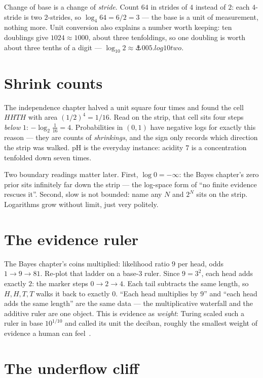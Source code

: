 \begin{narrative}
Change of base is a change of \emph{stride}. Count $64$ in strides of
$4$ instead of $2$: each $4$-stride is two $2$-strides, so
$\log_4 64 = 6/2 = 3$ — the base is a unit of measurement, nothing
more. Unit conversion also explains a number worth keeping: ten
doublings give $1024 \approx 1000$, about three tenfoldings, so one
doubling is worth about three tenths of a digit —
$\log_{10} 2 \approx \anchor{005.log10two}$.

\section{Shrink counts}

The independence chapter halved a unit square four times and found the
cell $HHTH$ with area $(1/2)^4 = 1/16$. Read on the strip, that cell
sits four steps \emph{below} $1$: $-\log_2 \tfrac{1}{16} = 4$.
Probabilities in $(0,1)$ have negative logs for exactly this reason —
they are counts of \emph{shrinkings}, and the sign only records which
direction the strip was walked. pH is the everyday instance: acidity
$7$ is a concentration tenfolded down seven times.

Two boundary readings matter later. First, $\log 0 = -\infty$: the
Bayes chapter's zero prior sits infinitely far down the strip — the
log-space form of ``no finite evidence rescues it''. Second, slow is
not bounded: name any $N$ and $2^N$ sits on the strip. Logarithms grow
without limit, just very politely.

\section{The evidence ruler}

The Bayes chapter's coins multiplied: likelihood ratio $9$ per head,
odds $1 \to 9 \to 81$. Re-plot that ladder on a base-$3$ ruler. Since
$9 = 3^2$, each head adds exactly $2$: the marker steps
$0 \to 2 \to 4$. Each tail subtracts the same length, so
$H, H, T, T$ walks it back to exactly $0$. ``Each head multiplies by
$9$'' and ``each head adds the same length'' are the same data — the
multiplicative waterfall and the additive ruler are one object. This
is evidence as \emph{weight}: Turing scaled such a ruler in base
$10^{1/10}$ and called its unit the deciban, roughly the smallest
weight of evidence a human can feel~\cite{algebra-good-weight-of-evidence-a-brief-survey}.

\section{The underflow cliff}


\end{narrative}
